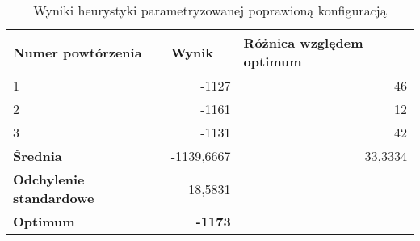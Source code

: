 \documentclass[./FM_mgr.tex]{subfiles}
\begin{document}
\begin{table}[H]
	\caption{Wyniki heurystyki parametryzowanej poprawioną konfiguracją \label{knapsack_tweak_results}}
	\centering
	\begin{tabular}{|l|r|r}
		\hline
		{\bf Numer powtórzenia}      & \multicolumn{1}{l|}{{\bf Wynik}} & \multicolumn{1}{l|}{{\bf Różnica względem optimum}} \\ \hline \hline
		1                                             & -1127                            & \multicolumn{1}{r|}{46}                             \\ \hline
		2                                             & -1161                            & \multicolumn{1}{r|}{12}                             \\ \hline
		3                                             & -1131                            & \multicolumn{1}{r|}{42}                             \\ \hline \hline
		{\bf Średnia}                                 & -1139,6667                       & \multicolumn{1}{r|}{33,3334}                        \\ \hline
		{\bf Odchylenie standardowe}                  & 18,5831                          &                                                     \\ \hhline{==~}
		{\bf Optimum}                                 & {\bf -1173}                      &                                                     \\ \cline{1-2}
	\end{tabular}
\end{table}

\end{document}

